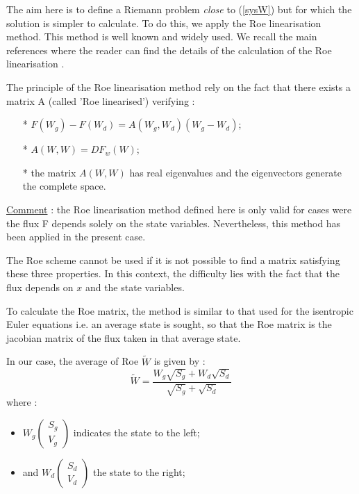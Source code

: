 \label{LinRoe}

The aim here is to define a Riemann problem \textit{close} to (\ref{sysW}) but for which the solution is simpler to calculate. To do this, we apply the Roe linearisation method. This method is well known and widely used. We recall the main references where the reader can find the details of the calculation of the Roe linearisation \cite{ROE81}\cite{BUFFARD93}.

\vspace{0.5cm}

The principle of the Roe linearisation method rely on the fact that there exists a matrix A (called 'Roe linearised') verifying :
\begin{itemize}
 \item[*] $F(W_g) - F(W_d) = A(W_g,W_d)(W_g-W_d)$;
 \item[*] $A(W,W) = DF_{w}(W)$;
 \item[*] the matrix $A(W,W)$ has real eigenvalues and the eigenvectors generate the complete space.
\end{itemize}

\vspace{0.5cm}

\underline{Comment} : the Roe linearisation method defined here is only valid for cases were the flux F depends solely on the state variables. Nevertheless, this method has been applied in the present case.

\vspace{0.5cm}

The Roe scheme cannot be used if it is not possible to find a matrix satisfying these three properties. In this context, the difficulty lies with the fact that the flux depends on $x$ and the state variables.

\vspace{0.5cm}

To calculate the Roe matrix, the method is similar to that used for the isentropic Euler equations i.e. an average state is sought, so that the Roe matrix is the jacobian matrix of the flux taken in that average state.

\vspace{0.5cm}

In our case, the average of Roe $\tilde W$ is given by :
\begin{equation}
 \tilde W = \frac{W_g \sqrt{S_g} + W_d \sqrt{S_d}}{\sqrt{S_g} + \sqrt{S_d}}
\end{equation}
where :
\begin{itemize}
 \item $W_g \left ( \begin{array}{c}
    S_g\\
    V_g
    \end{array} \right )$ indicates the state to the left;
 \item and $W_d \left ( \begin{array}{c}
    S_d\\
    V_d
    \end{array} \right )$ the state to the right;
\end{itemize}


